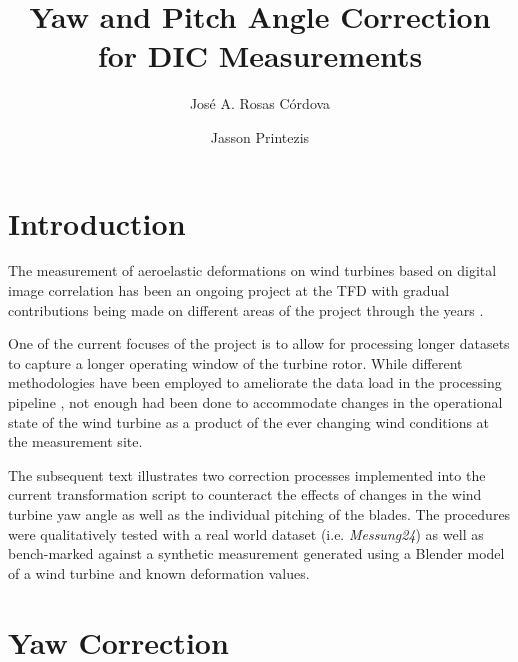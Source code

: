 \documentclass[12pt, a4paper, bibliography=totoc]{scrarticle}
\title{Yaw and Pitch Angle Correction for DIC Measurements}
\author{José A. Rosas Córdova}
\author{Jasson Printezis}
\affil[]{Institut für Turbomaschinen und Fluid-Dynamik}
\begin{document}
	\maketitle
	
	
	\tableofcontents
	\clearpage
	
	\section{Introduction}
	The measurement of aeroelastic deformations on wind turbines based on digital image correlation has been an ongoing project at the TFD with gradual contributions being made on different areas of the project through the years \cite{gossling2020qualifizierung,steimer2026auswertung,lehnhoff2026validation,winstroth2020optische}. 
	
	One of the current focuses of the project is to allow for processing longer datasets to capture a longer operating window of the turbine rotor. While different methodologies have been employed to ameliorate the data load in the processing pipeline \cite{automatisierung_auswertung_dic_2025}, not enough had been done to accommodate changes in the operational state of the wind turbine as a product of the ever changing wind conditions at the measurement site. 
	
	The subsequent text illustrates two correction processes implemented into the current transformation script to counteract the effects of changes in the wind turbine yaw angle as well as the individual pitching of the blades. The procedures were qualitatively tested with a real world dataset (i.e. \textit{Messung24}) as well as bench-marked against a synthetic measurement generated using a Blender model of a wind turbine and known deformation values.
	
	\section{Yaw Correction}
\end{document}
